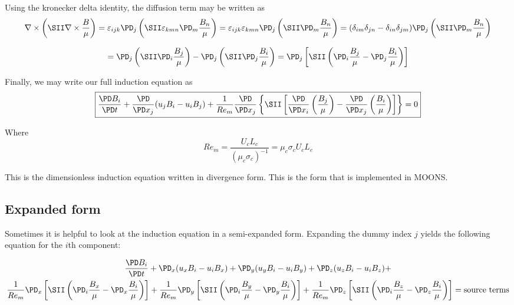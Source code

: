 \documentclass[11pt]{article}
\begin{document}
Using the kronecker delta identity, the diffusion term may be written as
\begin{equation}
	\nabla \times \left( \SII \nabla \times \frac{B}{\mu} \right)
	 = \varepsilon_{ijk} \PD_j \left( \SII \varepsilon_{kmn} \PD_m \frac{B_n}{\mu} \right)
	  = \varepsilon_{ijk} \varepsilon_{kmn} \PD_j \left( \SII \PD_m \frac{B_n}{\mu} \right)
	  = (\delta_{im}\delta_{jn} - \delta_{in}\delta_{jm}) \PD_j \left( \SII \PD_m \frac{B_n}{\mu} \right)
\end{equation}

\begin{equation}
	  = \PD_j \left( \SII \PD_i \frac{B_j}{\mu} \right)
	  - \PD_j \left( \SII \PD_j \frac{B_i}{\mu} \right)
	  = \PD_j \left[ \SII \left( \PD_i \frac{B_j}{\mu} - \PD_j \frac{B_i}{\mu} \right) \right]
\end{equation}

Finally, we may write our full induction equation as
\begin{equation}
	\boxed{
	\frac{\PD B_i}{\PD t}
	+ \frac{\PD}{\PD x_j} (u_j B_i - u_i B_j)
	+ \frac{1}{Re_m}
	\frac{\PD}{\PD x_j}
	\left\{ \SII
	\left[
	\frac{\PD}{\PD x_i}
	\left( \frac{B_j}{\mu} \right) -
	\frac{\PD}{\PD x_j}
	\left( \frac{B_i}{\mu} \right)
	\right]
	\right\} = 0
	}
\end{equation}

Where
\begin{equation}
	\boxed{
	Re_m = \frac{U_c L_c}{(\mu_c \sigma_c)^{-1}} = \mu_c \sigma_c U_c L_c
	}
\end{equation}

This is the dimensionless induction equation written in divergence form. This is the form that is implemented in MOONS.

\subsection{Expanded form}
Sometimes it is helpful to look at the induction equation in a semi-expanded form. Expanding the dummy index $j$ yields the following equation for the $i$th component:

\begin{multline}
	\frac{\PD B_i}{\PD t} +
	\PD_x (u_x B_i - u_i B_x) +
	\PD_y (u_y B_i - u_i B_y) +
	\PD_z (u_z B_i - u_i B_z) + \\
	\frac{1}{Re_m}
	\PD_x \left[ \SII \left( \PD_i \frac{B_x}{\mu} - \PD_x \frac{B_i}{\mu} \right) \right] +
	\frac{1}{Re_m}
	\PD_y \left[ \SII \left( \PD_i \frac{B_y}{\mu} - \PD_y \frac{B_i}{\mu} \right) \right] +
	\frac{1}{Re_m}
	\PD_z \left[ \SII \left( \PD_i \frac{B_z}{\mu} - \PD_z \frac{B_i}{\mu} \right) \right]  = \text{source terms}
\end{multline}
\end{document}
